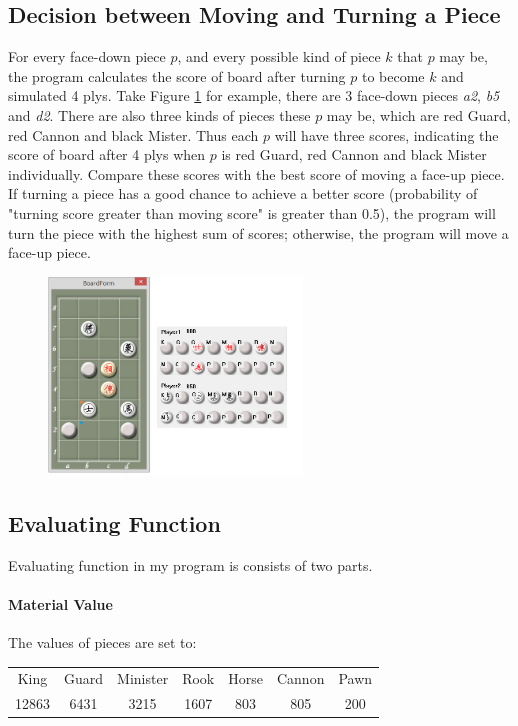 \documentclass[12pt]{article}
\begin{document}
		
\subsection{Decision between Moving and Turning a Piece}
 	For every face-down piece $p$, and every possible kind of piece $k$ that $p$ may be, the program calculates the score of board after turning $p$ to become $k$ and simulated 4 plys. Take Figure \ref{fig:turn} for example, there are 3 face-down pieces \textit{a2}, \textit{b5} and \textit{d2}. There are also three kinds of pieces these $p$ may be, which are red Guard, red Cannon and black Mister. Thus each $p$ will have three scores, indicating the score of board after 4 plys when $p$ is red Guard, red Cannon and black Mister individually. Compare these scores with the best score of moving a face-up piece. If turning a piece has a good chance to achieve a better score (probability of "turning score greater than moving score" is greater than 0.5), the program will turn the piece with the highest sum of scores; otherwise, the program will move a face-up piece.
 	
 	
 	\begin{figure}[H]
	\centering
	\includegraphics[width=0.6\textwidth]{fig_turn}
	\caption[Caption for the list of figures]{}
	\label{fig:turn}
	\end{figure}

\subsection{Evaluating Function}
	Evaluating function in my program is consists of two parts.
	\paragraph{Material Value}
		The values of pieces are set to:
			\begin{table}[H]
			\centering
			\label{my-label}
			\begin{tabular}{ccccccc}
			King  & Guard & Minister & Rook & Horse & Cannon & Pawn \\
			12863 & 6431  & 3215     & 1607 & 803   & 805    & 200 
			\end{tabular}
			\end{table}
			
\end{document}
